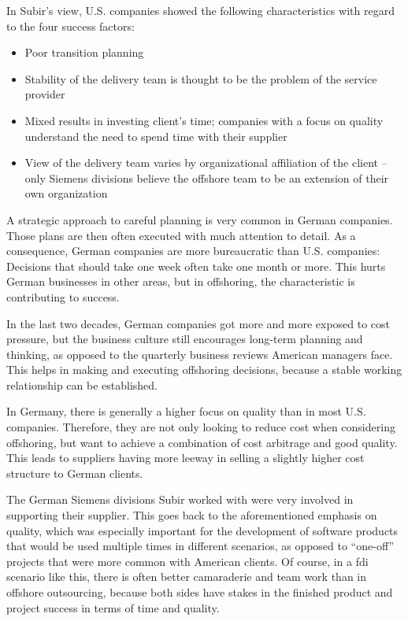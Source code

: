 In Subir's view, U.S. companies showed the following characteristics with regard to the four success factors:

\begin{itemize}
	\item Poor transition planning
	\item Stability of the delivery team is thought to be the problem of the service provider
	\item Mixed results in investing client's time; companies with a focus on quality understand the need to spend time with their supplier
	\item View of the delivery team varies by organizational affiliation of the client -- only Siemens divisions believe the offshore team to be an extension of their own organization
\end{itemize}

 A strategic approach to careful planning is very common in German companies. Those plans are then often executed with much attention to detail. As a consequence, German companies are more bureaucratic than U.S. companies: Decisions that should take one week often take one month or more. This hurts German businesses in other areas, but in offshoring, the characteristic is contributing to success.

In the last two decades, German companies got more and more exposed to cost pressure, but the business culture still encourages long-term planning and thinking, as opposed to the quarterly business reviews American managers face. This helps in making and executing offshoring decisions, because a stable working relationship can be established.

In Germany, there is generally a higher focus on quality than in most U.S. companies. Therefore, they are not only looking to reduce cost when considering offshoring, but  want to achieve a combination of cost arbitrage and good quality. This leads to suppliers having more leeway in selling a slightly higher cost structure to German clients.

The German Siemens divisions Subir worked with were very involved in supporting their supplier. This goes back to the aforementioned emphasis on quality, which was especially important for the development of software products that would be used multiple times in different scenarios, as opposed to ``one-off'' projects that were more common with American clients. Of course, in a \gls{fdi} scenario like this, there is often better camaraderie and team work than in offshore outsourcing, because both sides have stakes in the finished product and project success in terms of time and quality.

